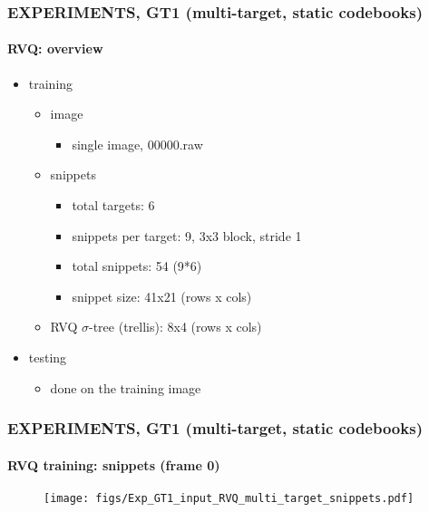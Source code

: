 \begin{frame}
\frametitle{\small EXPERIMENTS, GT1 (multi-target, static codebooks)}
\framesubtitle{RVQ: overview}
\mypagenum
	\begin{itemize}
		\item {\color{red} training}
			\begin{itemize}
				\item image
					\begin{itemize}
						\item single image, 00000.raw
					\end{itemize}
				\item snippets 
					\begin{itemize}
						\item total targets: 6						
						\item snippets per target: 9, 3x3 block, stride 1						
						\item total snippets: 54 (9*6)
						\item snippet size: 41x21 (rows x cols)
					\end{itemize}
				\item RVQ $\sigma$-tree (trellis): 8x4 (rows x cols)
			\end{itemize}
		\item {\color{red} testing}
			\begin{itemize}
				\item done on the training image
			\end{itemize}
	\end{itemize}
\end{frame}





\begin{frame}
\frametitle{\small EXPERIMENTS, GT1 (multi-target, static codebooks)}
\framesubtitle{RVQ training: snippets (frame 0)}
\mypagenum
	\begin{figure}
		\texttt{[image: figs/Exp\_GT1\_input\_RVQ\_multi\_target\_snippets.pdf]}
	\end{figure}
\end{frame}


